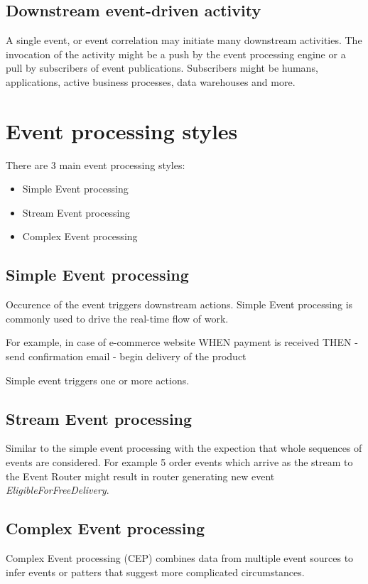 \documentclass[12pt, a4paper]{article}
\begin{document}
\subsection{Downstream event-driven activity}
A single event, or event correlation may initiate many downstream activities. The invocation of the activity might be a push by the event processing engine or a pull by subscribers of event publications. Subscribers might be humans, applications, active business processes, data warehouses and more.

\section{Event processing styles}
There are 3 main event processing styles:

\begin{itemize}
  \item Simple Event processing
  \item Stream Event processing
  \item Complex Event processing
\end{itemize}

\subsection{Simple Event processing}
Occurence of the event triggers downstream actions. Simple Event processing is commonly used to drive the real-time flow of work.

For example, in case of e-commerce website
WHEN payment is received THEN 
  - send confirmation email
  - begin delivery of the product

Simple event triggers one or more actions.  

\subsection{Stream Event processing}
Similar to the simple event processing with the expection that whole sequences of events are considered. For example 5 order events which arrive as the stream to the Event Router might result in router generating new event \emph{EligibleForFreeDelivery}.

\subsection{Complex Event processing}
Complex Event processing (CEP) combines data from multiple event sources to infer events or patters that suggest more complicated circumstances. 
  
\end{document}
